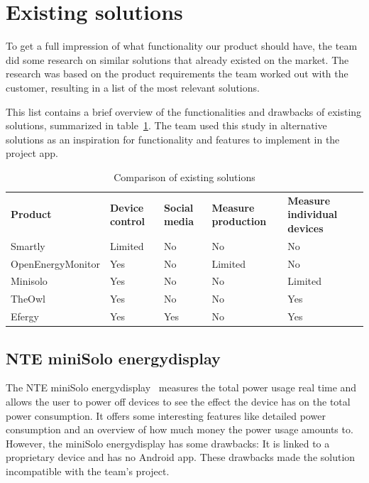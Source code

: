 \section{Existing solutions}
\label{sec:altsolution}

To get a full impression of what functionality our product should have, the team did some research on similar solutions that already existed on the market. The research was based on the product requirements the team worked out with the customer, resulting in a list of the most relevant solutions.
 
This list contains a brief overview of the functionalities and drawbacks of existing solutions, summarized in table~\ref{tab:existingSolutions}. The team used this study in alternative solutions as an inspiration for functionality and features to implement in the project app.


\begin{table}[H]
\centering
{}
\begin{tabular}{|l|l|p{2.6cm}|p{2.3cm}|p{2.2cm}|}
\hline
\textbf{Product} & \textbf{Device control} & \textbf{Social media} & \textbf{Measure production} & \textbf{Measure individual devices} \\
Smartly & Limited & No  & No & No\\
OpenEnergyMonitor & Yes & No  & Limited & No \\
Minisolo & Yes & No  & No & Limited\\
TheOwl & Yes & No & No & Yes\\
Efergy & Yes & Yes &  No & Yes\\\hline
\end{tabular}
\caption{Comparison of existing solutions}
\label{tab:existingSolutions}
\end{table}


\subsection{NTE miniSolo energydisplay}

The NTE miniSolo energydisplay~\cite{nte} measures the total power usage real time and allows the user to power off devices to see the effect the device has on the total power consumption. It offers some interesting features like detailed power consumption and an overview of how much money the power usage amounts to. However, the miniSolo energydisplay has some drawbacks: It is linked to a proprietary device and has no Android app. These drawbacks made the solution incompatible with the team's project.



